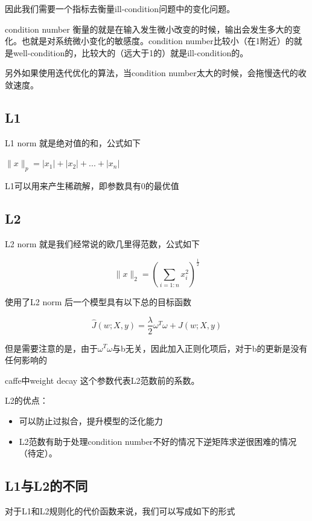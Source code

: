 	因此我们需要一个指标去衡量ill-condition问题中的变化问题。
	
	condition number 衡量的就是在输入发生微小改变的时候，输出会发生多大的变化。也就是对系统微小变化的敏感度。condition number比较小（在1附近）的就是well-condition的，比较大的（远大于1的）就是ill-condition的。
	
	另外如果使用迭代优化的算法，当condition number太大的时候，会拖慢迭代的收敛速度。
	
	\subsection{L1}
	L1 norm 就是绝对值的和，公式如下
	
	$\|x\|_p = |x_1|+|x_2|+...+|x_n|$
	
	L1可以用来产生稀疏解，即参数具有0的最优值
	
	\subsection{L2}
	L2 norm 就是我们经常说的欧几里得范数，公式如下
	
	\begin{equation}
		\|x\|_2 = (\sum_{i=1:n}x_i ^{2})^{\frac{1}{2}}
	\end{equation}
	
	使用了L2 norm 后一个模型具有以下总的目标函数
	
	\begin{equation}
		\hat{J}(w;X,y) = \frac{\lambda}{2}\omega^T \omega +J(w;X,y)
	\end{equation}
	
	但是需要注意的是，由于$\omega^T \omega$与b无关，因此加入正则化项后，对于b的更新是没有任何影响的
	
	
	caffe中weight decay 这个参数代表L2范数前的系数。
	
	L2的优点：
	\begin{itemize}
		\item 可以防止过拟合，提升模型的泛化能力
		\item L2范数有助于处理condition number不好的情况下逆矩阵求逆很困难的情况（待定）。
	\end{itemize}

	
	
	\subsection{L1与L2的不同}
	对于L1和L2规则化的代价函数来说，我们可以写成如下的形式
	
